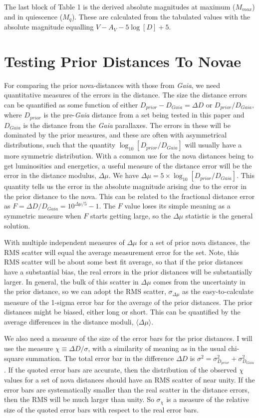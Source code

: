 \documentclass[a4paper,fleqn,usenatbib]{mnras}
\begin{document}
The last block of Table 1 is the derived absolute magnitudes at maximum ($M_{max}$) and in quiescence ($M_q$).  These are calculated from the tabulated values with the absolute magnitude equalling $V-A_V-5\log[D]+5$.

\section{Testing Prior Distances To Novae}

For comparing the prior nova-distances with those from {\it Gaia}, we need quantitative measures of the errors in the distance.  The size the distance errors can be quantified as some function of either $D_{prior}-D_{Gaia} = \Delta D$ or $D_{prior}/D_{Gaia}$, where $D_{prior}$ is the pre-{\it Gaia} distance from a set being tested in this paper and $D_{Gaia}$ is the distance from the {\it Gaia} parallaxes.  The errors in these will be dominated by the prior measures, and these are often with asymmetrical distributions, such that the quantity $\log_{10}[D_{prior}/D_{Gaia}]$ will usually have a more symmetric distribution.  With a common use for the nova distances being to get luminosities and energetics, a useful measure of the distance error will be the error in the distance modulus, $\Delta \mu$.  We have $\Delta \mu = 5\times \log_{10}[D_{prior}/D_{Gaia}]$.  This quantity tells us the error in the absolute magnitude arising due to the error in the prior distance to the nova.  This can be related to the fractional distance error as $F=\Delta D / D_{Gaia} = 10^{\Delta \mu / 5}-1$.  The $F$ value loses its simple meaning as a symmetric measure when $F$ starts getting large, so the $\Delta \mu$ statistic is the general solution. 

With multiple independent measures of $\Delta \mu$ for a set of prior nova distances, the RMS scatter will equal the average measurement error for the set.  Note, this RMS scatter will be about some best fit average, so that if the prior distances have a substantial bias, the real errors in the prior distances will be substantially larger.  In general, the bulk of this scatter in $\Delta \mu$ comes from the uncertainty in the prior distance, so we can adopt the RMS scatter, $\sigma_{\Delta \mu}$ as the easy-to-calculate measure of the 1-sigma error bar for the average of the prior distances.  The prior distances might be biased, either long or short.  This can be quantified by the average differences in the distance moduli, $\langle \Delta \mu \rangle$.

We also need a measure of the size of the error bars for the prior distances.  I will use the measure $\chi \equiv \Delta D / \sigma$, with a similarity of meaning as in the usual chi-square summation.  The total error bar in the difference $\Delta D$ is $\sigma^2 = \sigma^2_{D_{prior}} + \sigma^2_{D_{Gaia}}$.  If the quoted error bars are accurate, then the distribution of the observed $\chi$ values for a set of nova distances should have an RMS scatter of near unity.  If the error bars are systematically smaller than the real scatter in the distance errors, then the RMS will be much larger than unity.  So $\sigma _{\chi}$ is a measure of the relative size of the quoted error bars with respect to the real error bars.
\end{document}
